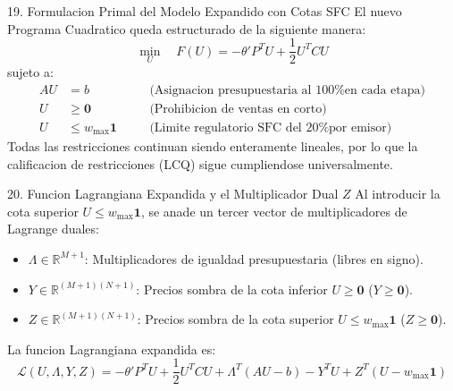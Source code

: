 \documentclass[aspectratio=169,10pt]{beamer}
\begin{document}
\begin{frame}{19. Formulacion Primal del Modelo Expandido con Cotas SFC}
  El nuevo Programa Cuadratico queda estructurado de la siguiente manera:
  \vspace{0.3cm}
  \begin{equation*}
    \min_{U} \quad F(U) = -\theta' P^T U + \frac{1}{2} U^T C U
  \end{equation*}
  \vspace{0.2cm}
  sujeto a:
  \vspace{0.2cm}
  \begin{align*}
    A U &= b \quad &&\text{(Asignacion presupuestaria al 100\% en cada etapa)} \\
    U &\ge \mathbf{0} \quad &&\text{(Prohibicion de ventas en corto)} \\
    U &\le w_{\max} \mathbf{1} \quad &&\text{(Limite regulatorio SFC del 20\% por emisor)}
  \end{align*}
  \vspace{0.2cm}
  Todas las restricciones continuan siendo enteramente lineales, por lo que la calificacion de restricciones (LCQ) sigue cumpliendose universalmente.
\end{frame}

\begin{frame}{20. Funcion Lagrangiana Expandida y el Multiplicador Dual $Z$}
  Al introducir la cota superior $U \le w_{\max}\mathbf{1}$, se anade un tercer vector de multiplicadores de Lagrange duales:
  \vspace{0.3cm}
  \begin{itemize}
    \item $\Lambda \in \mathbb{R}^{M+1}$: Multiplicadores de igualdad presupuestaria (libres en signo).
    \vspace{0.1cm}
    \item $Y \in \mathbb{R}^{(M+1)(N+1)}$: Precios sombra de la cota inferior $U \ge \mathbf{0}$ ($Y \ge \mathbf{0}$).
    \vspace{0.1cm}
    \item $Z \in \mathbb{R}^{(M+1)(N+1)}$: Precios sombra de la cota superior $U \le w_{\max}\mathbf{1}$ ($Z \ge \mathbf{0}$).
  \end{itemize}
  \vspace{0.2cm}
  La funcion Lagrangiana expandida es:
  \vspace{0.2cm}
  \begin{equation*}
    \mathcal{L}(U, \Lambda, Y, Z) = -\theta' P^T U + \frac{1}{2} U^T C U + \Lambda^T (AU - b) - Y^T U + Z^T (U - w_{\max} \mathbf{1})
  \end{equation*}
\end{frame}
\end{document}
